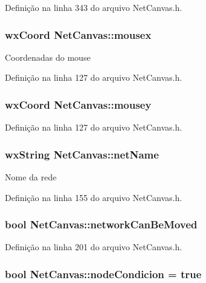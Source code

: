 Definição na linha 343 do arquivo Net\+Canvas.\+h.

\subsubsection[{mousex}]{\setlength{\rightskip}{0pt plus 5cm}wx\+Coord Net\+Canvas\+::mousex}\label{class_net_canvas_a9c8b505e2b1a84f08607e4ef55334abf}
Coordenadas do mouse 

Definição na linha 127 do arquivo Net\+Canvas.\+h.

\subsubsection[{mousey}]{\setlength{\rightskip}{0pt plus 5cm}wx\+Coord Net\+Canvas\+::mousey}\label{class_net_canvas_af604ee694514e05dd1c2222bea1d8449}


Definição na linha 127 do arquivo Net\+Canvas.\+h.

\subsubsection[{net\+Name}]{\setlength{\rightskip}{0pt plus 5cm}wx\+String Net\+Canvas\+::net\+Name}\label{class_net_canvas_a2940b8731cc07dc1acfdd4b4d626d852}
Nome da rede 

Definição na linha 155 do arquivo Net\+Canvas.\+h.

\subsubsection[{network\+Can\+Be\+Moved}]{\setlength{\rightskip}{0pt plus 5cm}bool Net\+Canvas\+::network\+Can\+Be\+Moved}\label{class_net_canvas_a2ae5249f2fb8e7ff7b15dd77d9667836}


Definição na linha 201 do arquivo Net\+Canvas.\+h.

\subsubsection[{node\+Condicion}]{\setlength{\rightskip}{0pt plus 5cm}bool Net\+Canvas\+::node\+Condicion = true}\label{class_net_canvas_a64b96954a1084e6c0ad6c8427fe69825}


